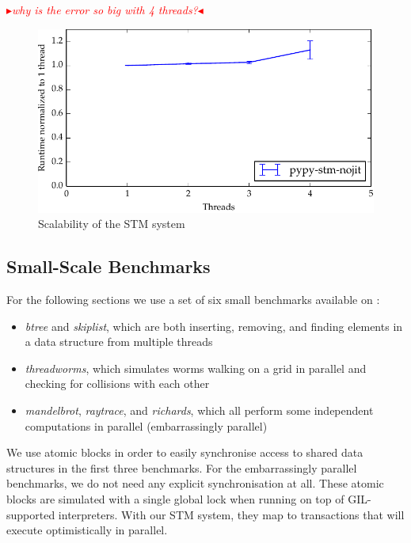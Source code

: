 \documentclass{sigplanconf}
\newcommand{\mynote}[2]{%
  \textcolor{red}{%
    \fbox{\bfseries\sffamily\scriptsize#1}%
    {\small$\blacktriangleright$\textsf{\emph{#2}}$\blacktriangleleft$}%
  }%
}
\newcommand\cfbolz[1]{\mynote{cfbolz}{#1}}
\begin{document}
\cfbolz{why is the error so big with 4 threads?}

\begin{figure}[h]
  \centering
  \includegraphics[width=1\columnwidth]{plots/scaling.pdf}
  \caption{Scalability of the STM system\label{fig:scaling}}
\end{figure}


\subsection{Small-Scale Benchmarks\label{sec:performance-bench}}

For the following sections we use a set of six small benchmarks
available on \cite{pypybenchs}:

\begin{itemize}
\item \emph{btree} and \emph{skiplist}, which are both inserting,
  removing, and finding elements in a data structure from multiple
  threads
\item \emph{threadworms}, which simulates worms walking on a grid in
  parallel and checking for collisions with each other
\item \emph{mandelbrot}, \emph{raytrace}, and \emph{richards}, which
  all perform some independent computations in parallel (embarrassingly
  parallel)
\end{itemize}

We use atomic blocks in order to easily synchronise access to shared
data structures in the first three benchmarks. For the embarrassingly
parallel benchmarks, we do not need any explicit synchronisation at
all. These atomic blocks are simulated with a single global lock
when running on top of GIL-supported interpreters. With our STM
system, they map to transactions that will execute optimistically
in parallel.
\end{document}
